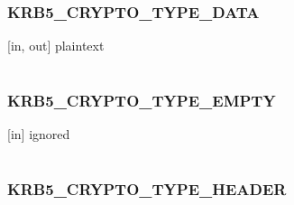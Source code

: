\documentclass[letterpaper,10pt,english]{sphinxmanual}
\begin{document}
\subsubsection{KRB5\_CRYPTO\_TYPE\_DATA}
\label{appdev/refs/macros/KRB5_CRYPTO_TYPE_DATA::doc}\label{appdev/refs/macros/KRB5_CRYPTO_TYPE_DATA:krb5-crypto-type-data}\label{appdev/refs/macros/KRB5_CRYPTO_TYPE_DATA:krb5-crypto-type-data-data}

\begin{fulllineitems}
\label{appdev/refs/macros/KRB5_CRYPTO_TYPE_DATA:KRB5_CRYPTO_TYPE_DATA}
\end{fulllineitems}


{[}in, out{]} plaintext

\begin{tabulary}{\linewidth}{|L|L|}
\hline

 & 
\\
\hline\end{tabulary}



\subsubsection{KRB5\_CRYPTO\_TYPE\_EMPTY}
\label{appdev/refs/macros/KRB5_CRYPTO_TYPE_EMPTY::doc}\label{appdev/refs/macros/KRB5_CRYPTO_TYPE_EMPTY:krb5-crypto-type-empty}\label{appdev/refs/macros/KRB5_CRYPTO_TYPE_EMPTY:krb5-crypto-type-empty-data}

\begin{fulllineitems}
\label{appdev/refs/macros/KRB5_CRYPTO_TYPE_EMPTY:KRB5_CRYPTO_TYPE_EMPTY}
\end{fulllineitems}


{[}in{]} ignored

\begin{tabulary}{\linewidth}{|L|L|}
\hline

 & 
\\
\hline\end{tabulary}



\subsubsection{KRB5\_CRYPTO\_TYPE\_HEADER}
\label{appdev/refs/macros/KRB5_CRYPTO_TYPE_HEADER:krb5-crypto-type-header}\label{appdev/refs/macros/KRB5_CRYPTO_TYPE_HEADER:krb5-crypto-type-header-data}\label{appdev/refs/macros/KRB5_CRYPTO_TYPE_HEADER::doc}
\end{document}

